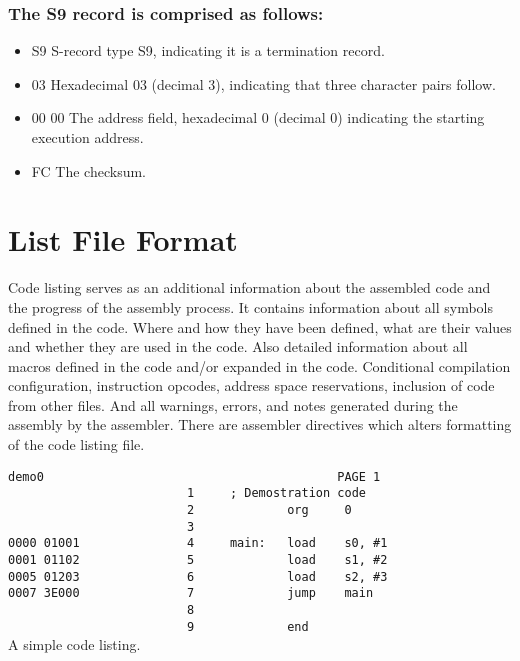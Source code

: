     \subsubsection{The S9 record is comprised as follows:}
        \begin{itemize}
            \item S9 S-record type S9, indicating it is a termination record.
            \item 03 Hexadecimal 03 (decimal 3), indicating that three character pairs follow.
            \item 00 00 The address field, hexadecimal 0 (decimal 0) indicating the starting execution address.
            \item FC The checksum.
        \end{itemize}

\clearpage
\section{List File Format}
    Code listing serves as an additional information about the assembled code and the progress of the assembly process. It contains information about all symbols defined in the code. Where and how they have been defined, what are their values and whether they are used in the code. Also detailed information about all macros defined in the code and/or expanded in the code. Conditional compilation configuration, instruction opcodes, address space reservations, inclusion of code from other files. And all warnings, errors, and notes generated during the assembly by the assembler. There are assembler directives which alters formatting of the code listing file.

    \begin{code}[h]
        \verb'demo0                                         PAGE 1'\\
        \verb'                         1     ; Demostration code'\\
        \verb'                         2             org     0'\\
        \verb'                         3'\\
        \verb'0000 01001               4     main:   load    s0, #1'\\
        \verb'0001 01102               5             load    s1, #2'\\
        \verb'0005 01203               6             load    s2, #3'\\
        \verb'0007 3E000               7             jump    main'\\
        \verb'                         8'\\
        \verb'                         9             end'\\
        \caption{A simple code listing.}
    \end{code}

